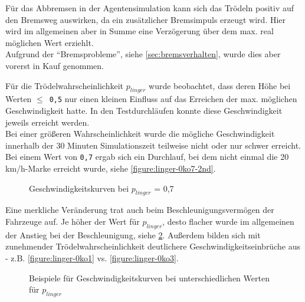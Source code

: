 Für das Abbremsen in der Agentensimulation kann sich das Trödeln positiv auf den Bremsweg auswirken, da ein zusätzlicher Bremsimpuls erzeugt wird. 
Hier wird im allgemeinen aber in Summe eine Verzögerung über dem max. real möglichen Wert erziehlt.
\\
Aufgrund der \enquote{Bremsprobleme}, siehe \cref{sec:bremsverhalten}, wurde dies aber vorerst in Kauf genommen.

Für die Trödelwahrscheinlichkeit $ p_{linger} $ wurde beobachtet, dass deren Höhe bei Werten \mbox{$\leq$ \texttt{0,5}} nur einen kleinen Einfluss auf das Erreichen der max. möglichen Geschwindigkeit hatte.
In den Testdurchläufen konnte diese Geschwindigkeit jeweils erreicht werden.
\\
Bei einer größeren Wahrscheinlichkeit wurde die mögliche Geschwindigkeit innerhalb der 30 Minuten Simulationszeit teilweise nicht oder nur schwer erreicht.
Bei einem Wert von \texttt{0,7} ergab sich ein Durchlauf, bei dem nicht einmal die 20 km/h-Marke erreicht wurde, siehe \cref{figure:linger-0ko7-2nd}.

\begin{figure}[hptb]
  \centering 
   \qquad
   \qquad
  \caption{Geschwindigkeitskurven bei $p_{linger}$ = 0,7}
  \label{figure:linger-0ko7}
\end{figure}

Eine merkliche Veränderung trat auch beim Beschleunigungsvermögen der Fahrzeuge auf.
Je höher der Wert für $ p_{linger} $, desto flacher wurde im allgemeinen der Anstieg bei der Beschleunigung, siehe \cref{figure:linger-0ko1-3-5}.
Außerdem bilden sich mit zunehmender Trödelwahrscheinlichkeit deutlichere Geschwindigkeitseinbrüche aus - z.B. \cref{figure:linger-0ko1} vs. \cref{figure:linger-0ko3}.

\begin{figure}[hptb]
  \centering 
   \qquad
   \qquad
  \caption{Beispiele für Geschwindigkeitskurven bei unterschiedlichen Werten für $p_{linger}$}
  \label{figure:linger-0ko1-3-5}
\end{figure}

